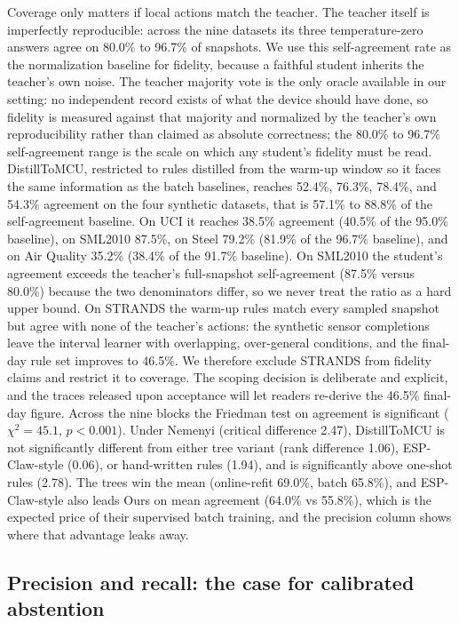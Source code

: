 \documentclass[11pt,a4paper]{article}
\begin{document}
Coverage only matters if local actions match the teacher. The teacher itself
is imperfectly reproducible: across the nine datasets its three
temperature-zero answers agree on 80.0\% to 96.7\% of snapshots. We use this
self-agreement rate as the normalization baseline for fidelity, because a
faithful student inherits the teacher's own noise. The teacher majority vote
is the only oracle available in our setting: no independent record exists of
what the device should have done, so fidelity is measured against that
majority and normalized by the teacher's own reproducibility rather than
claimed as absolute correctness; the 80.0\% to 96.7\% self-agreement range is
the scale on which any student's fidelity must be read. DistillToMCU, restricted
to rules distilled from the warm-up window so it faces the same information
as the batch baselines, reaches 52.4\%, 76.3\%, 78.4\%, and 54.3\% agreement
on the four synthetic datasets, that is 57.1\% to 88.8\% of the
self-agreement baseline. On UCI it reaches 38.5\% agreement (40.5\% of the
95.0\% baseline), on SML2010 87.5\%, on Steel 79.2\% (81.9\% of the 96.7\%
baseline), and on Air Quality 35.2\% (38.4\% of the 91.7\% baseline). On
SML2010 the student's agreement exceeds the teacher's full-snapshot
self-agreement (87.5\% versus 80.0\%) because the two denominators differ, so
we never treat the ratio as a hard upper bound. On STRANDS the warm-up rules
match every sampled snapshot but agree with none of the teacher's actions:
the synthetic sensor completions leave the interval learner with overlapping,
over-general conditions, and the final-day rule set improves to 46.5\%. We
therefore exclude STRANDS from fidelity claims and restrict it to coverage.
The scoping decision is deliberate and explicit, and the traces released upon
acceptance will let readers re-derive the 46.5\% final-day figure. Across the
nine blocks the Friedman test on agreement is significant ($\chi^2 = 45.1$,
$p < 0.001$). Under Nemenyi (critical difference 2.47), DistillToMCU is not
significantly different from either tree variant (rank difference 1.06),
ESP-Claw-style (0.06), or hand-written rules (1.94), and is significantly
above one-shot rules (2.78). The trees win the mean (online-refit 69.0\%,
batch 65.8\%), and ESP-Claw-style also leads Ours on mean agreement (64.0\%
vs 55.8\%), which is the expected price of their supervised batch training,
and the precision column shows where that advantage leaks away.

\subsection{Precision and recall: the case for calibrated abstention}
\end{document}
